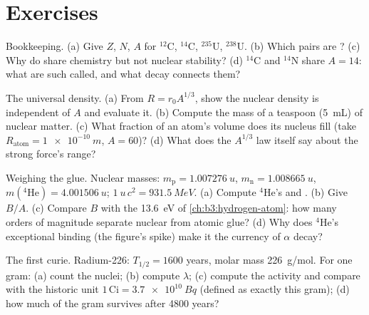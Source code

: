 \section{Exercises}

\begin{exercise}[$\star$]\label{exo:b3:nuclear-physics:1}
Bookkeeping. (a) Give $Z$, $N$, $A$ for $^{12}$C, $^{14}$C,
$^{235}$U, $^{238}$U. (b) Which pairs are ? (c) Why do
 share chemistry but not nuclear stability? (d) $^{14}$C
and $^{14}$N share $A = 14$: what are such  called, and
what decay connects them?
\end{exercise}

\begin{exercise}[$\star$]\label{exo:b3:nuclear-physics:2}
The universal density. (a) From $R = r_0A^{1/3}$, show the
nuclear density is independent of $A$ and evaluate it. (b)
Compute the mass of a teaspoon (\qty{5}{mL}) of nuclear matter.
(c) What fraction of an atom's volume does its nucleus fill (take
$R_{\text{atom}} = \qty{1e-10}{m}$, $A = 60$)? (d) What does the
$A^{1/3}$ law itself say about the strong force's range?
\end{exercise}

\begin{exercise}[$\star$]\label{exo:b3:nuclear-physics:3}
Weighing the glue. Nuclear masses: $m_{\text{p}} =
\qty{1.007276}{u}$, $m_{\text{n}} = \qty{1.008665}{u}$,
$m(^4\text{He}) = \qty{4.001506}{u}$;
$\qty{1}{u}\,c^2 = \qty{931.5}{MeV}$. (a) Compute $^4$He's  and . (b) Give $B/A$. (c) Compare $B$ with
the \qty{13.6}{eV} of \cref{ch:b3:hydrogen-atom}: how many orders
of magnitude separate nuclear from atomic glue? (d) Why does
$^4$He's exceptional binding (the figure's spike) make it the
currency of $\alpha$ decay?
\end{exercise}

\begin{exercise}[$\star$]\label{exo:b3:nuclear-physics:4}
The first curie. Radium-226: $T_{1/2} = 1600$ years, molar mass
\qty{226}{g/mol}. For one gram: (a) count the nuclei; (b) compute
$\lambda$; (c) compute the activity and compare with the historic
unit $1\,\text{Ci} = \qty{3.7e10}{Bq}$ (defined as exactly this
gram); (d) how much of the gram survives after 4800 years?
\end{exercise}

